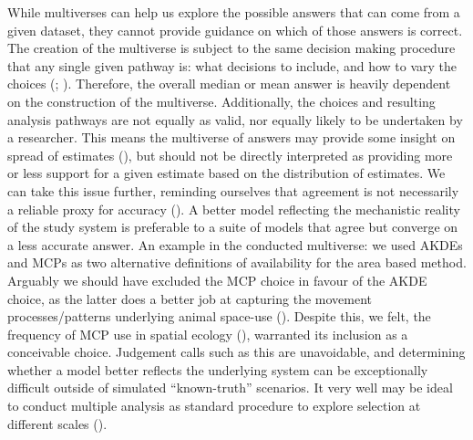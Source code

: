 \documentclass[10pt,a4paper]{article}
\begin{document}
While multiverses can help us explore the possible answers that can come from a given dataset, they cannot provide guidance on which of those answers is correct.
The creation of the multiverse is subject to the same decision making procedure that any single given pathway is: what decisions to include, and how to vary the choices (; ).
Therefore, the overall median or mean answer is heavily dependent on the construction of the multiverse.
Additionally, the choices and resulting analysis pathways are not equally as valid, nor equally likely to be undertaken by a researcher.
This means the multiverse of answers may provide some insight on spread of estimates (), but should not be directly interpreted as providing more or less support for a given estimate based on the distribution of estimates.
We can take this issue further, reminding ourselves that agreement is not necessarily a reliable proxy for accuracy ().
A better model reflecting the mechanistic reality of the study system is preferable to a suite of models that agree but converge on a less accurate answer.
An example in the conducted multiverse: we used AKDEs and MCPs as two alternative definitions of availability for the area based method.
Arguably we should have excluded the MCP choice in favour of the AKDE choice, as the latter does a better job at capturing the movement processes/patterns underlying animal space-use ().
Despite this, we felt, the frequency of MCP use in spatial ecology (), warranted its inclusion as a conceivable choice.
Judgement calls such as this are unavoidable, and determining whether a model better reflects the underlying system can be exceptionally difficult outside of simulated ``known-truth'' scenarios.
It very well may be ideal to conduct multiple analysis as standard procedure to explore selection at different scales ().
\end{document}
